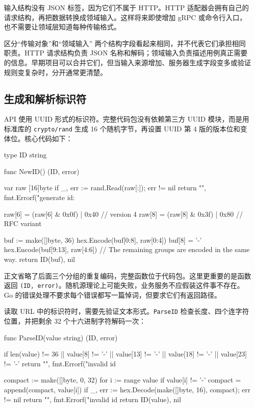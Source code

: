输入结构没有 JSON 标签，因为它们不属于 HTTP。HTTP 适配器会拥有自己的请求结构，再把数据转换成领域输入。这样将来即使增加 gRPC 或命令行入口，也不需要让领域层知道每种传输格式。

\begin{tipbox}{区分“传输对象”和“领域输入”}
两个结构字段看起来相同，并不代表它们承担相同职责。HTTP 请求结构负责 JSON 名称和解码；领域输入负责描述用例真正需要的信息。早期项目可以合并它们，但当输入来源增加、服务器生成字段变多或验证规则变复杂时，分开通常更清楚。
\end{tipbox}

\subsection{生成和解析标识符}

API 使用 UUID 形式的标识符。完整代码包没有依赖第三方 UUID 模块，而是用标准库的 \texttt{crypto/rand} 生成 16 个随机字节，再设置 UUID 第 4 版的版本位和变体位。核心代码如下：

\begin{gocode}[title={代码清单 12.9 \texttt{id.go}：生成 UUID 形式的 ID}]
type ID string

func NewID() (ID, error) {
    var raw [16]byte
    if _, err := rand.Read(raw[:]); err != nil {
        return "", fmt.Errorf("generate id: %
    }

    raw[6] = (raw[6] & 0x0f) | 0x40 // version 4
    raw[8] = (raw[8] & 0x3f) | 0x80 // RFC variant

    buf := make([]byte, 36)
    hex.Encode(buf[0:8], raw[0:4])
    buf[8] = '-'
    hex.Encode(buf[9:13], raw[4:6])
    // The remaining groups are encoded in the same way.
    return ID(buf), nil
}
\end{gocode}

正文省略了后面三个分组的重复编码，完整函数位于代码包。这里更重要的是函数返回 \texttt{(ID, error)}。随机源理论上可能失败，业务服务不应假装这件事不存在。Go 的错误处理不要求每个错误都写一篇悼词，但要求它们有返回路径。

读取 URL 中的标识符时，需要先验证文本形式。\texttt{ParseID} 检查长度、四个连字符位置，并把剩余 32 个十六进制字符解码一次：

\begin{gocode}[title={代码清单 12.10 \texttt{id.go}：解析客户端标识符}]
func ParseID(value string) (ID, error) {
    if len(value) != 36 || value[8] != '-' ||
        value[13] != '-' || value[18] != '-' || value[23] != '-' {
        return "", fmt.Errorf("invalid id %
    }

    compact := make([]byte, 0, 32)
    for i := range value {
        if value[i] != '-' {
            compact = append(compact, value[i])
        }
    }
    if _, err := hex.Decode(make([]byte, 16), compact); err != nil {
        return "", fmt.Errorf("invalid id %
    }
    return ID(value), nil
}
\end{gocode}

